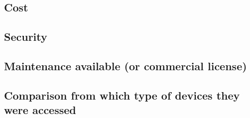 \documentclass[11]{article}
\begin{document}

	

	\subsection{Cost}
	
	\subsection{Security}

	\subsection{Maintenance available (or commercial license)}

	\subsection{Comparison from which type of devices they were accessed}
\end{document}
